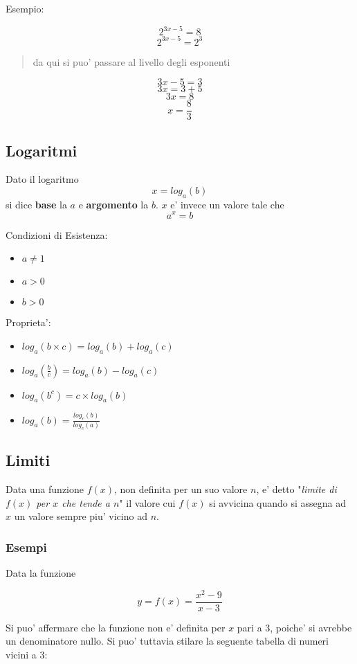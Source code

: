 \documentclass{article}
\begin{document}
{  Esempio:

  $$ 2^{3x - 5} = 8 $$
  $$ 2^{3x - 5} = 2^3 $$

  \begin{quote}
    da qui si puo' passare al livello degli esponenti
  \end{quote}

  $$ 3x - 5 = 3 $$
  $$ 3x = 3 + 5 $$
  $$ 3x = 8 $$
  $$ x = \frac{8}{3} $$

  \subsection{Logaritmi}
  Dato il logaritmo
  $$ x = log_a(b) $$
  si dice \textbf{base} la $ a $ e \textbf{argomento} la $ b $. $ x $ e' invece un valore tale che
  $$ a^x = b $$

  Condizioni di Esistenza:
  \begin{itemize}
    \item $ a \neq 1 $
    \item $ a > 0 $
    \item $ b > 0 $
  \end{itemize}

  Proprieta':
  \begin{itemize}
    \item $ log_a(b \times c) = log_a(b) + log_a(c) $
    \item $ log_a(\frac{b}{c}) = log_a(b) - log_a(c) $
    \item $ log_a(b^c) = c \times log_a(b) $
    \item $ log_a(b) = \frac{log_c(b)}{log_c(a)} $
  \end{itemize}

  \subsection{Limiti}
  Data una funzione $ f(x) $, non definita per un suo valore $ n $, e' detto "\textit{limite di $ f(x) $ per $ x $ che tende a $ n $}" il valore cui $ f(x) $ si avvicina quando si assegna ad $ x $ un valore sempre piu' vicino ad $ n $.

  \subsubsection{Esempi} %
  Data la funzione

  $$ y = f(x) = \frac{x^2 - 9}{x - 3} $$

  Si puo' affermare che la funzione non e' definita per $ x $ pari a 3, poiche' si avrebbe un denominatore nullo. Si puo' tuttavia stilare la seguente tabella di numeri vicini a 3:
  
}
\end{document}
